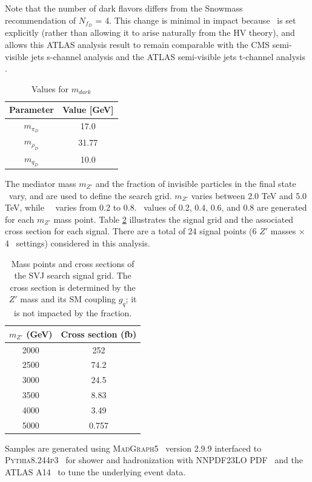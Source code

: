 Note that the number of dark flavors differs from the Snowmass~\cite{snowmass} recommendation of $N_{f_D}$ = 4. 
This change is minimal in impact because \rinv~is set explicitly (rather than allowing it to arise naturally from the HV theory), and allows this ATLAS analysis result to remain comparable with the CMS semi-visible jets s-channel analysis \cite{cms_svj} and the ATLAS semi-visible jets t-channel analysis \cite{tchannel}. \par

\begin{table}
\centering
  \begin{tabular}{ |c|c| }
    \hline
    Parameter & Value [GeV] \\
    \hline
     $m_{\pi_D}$ & 17.0 \\
     $m_{\rho_D}$ & 31.77 \\ 
     $m_{q_D}$ & 10.0 \\ 
    \hline
  \end{tabular}
  \caption{Values for $m_{dark}$}
  \label{tab:model_mdark}
\end{table}

The mediator mass $m_{Z'}$ and the fraction of invisible particles in the final state \rinv~vary, and are used to define the search grid. $m_{Z'}$ varies between 2.0 TeV and 5.0 TeV, while~\rinv~ varies from 0.2 to 0.8. \rinv~values of 0.2, 0.4, 0.6, and 0.8 are generated for each $m_{Z'}$ mass point. Table \ref{tab:sig_grid} illustrates the signal grid and the associated cross section for each signal. There are a total of 24 signal points (6 $Z'$ masses $\times$ 4 \rinv~settings) considered in this analysis.

\begin{table}
\centering
  \begin{tabular}{ |c|c| }
    \hline
    $m_{Z'}$ (GeV) & Cross section (fb)  \\
    \hline
     2000 &  252 \\
     2500 &  74.2 \\
     3000 &  24.5\\ 
     3500 &  8.83\\
     4000 &  3.49 \\ 
     5000 &  0.757 \\
    \hline
  \end{tabular}
  \caption{Mass points and cross sections of the SVJ search signal grid. The cross section is determined by the $Z'$ mass and its SM coupling $g_q$; it is not impacted by the \rinv fraction.}
  \label{tab:sig_grid}
\end{table}

Samples are generated using 
\textsc{MadGraph5}~\cite{Alwall:2014hca} version 2.9.9 interfaced to 
\textsc{Pythia8.244p3}~\cite{pythia} for shower and hadronization with 
NNPDF23LO PDF~\cite{Butterworth:2015oua} and the 
ATLAS A14~\cite{Skands:2014pea} to tune the underlying event data.
